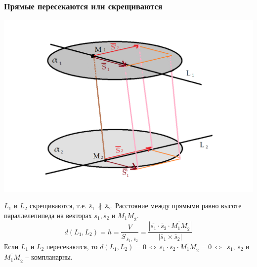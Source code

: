 \documentclass{article}
\begin{document}
\subsubsection{Прямые пересекаются или скрещиваются}
\begin{center}
    \includegraphics[scale=0.6]{pic11.png}
\end{center}
$L_1$ и $L_2$ скрещиваются, т.е. $\overline{s}_1\,\nparallel\,\overline{s}_2$. Расстояние между прямыми равно высоте параллелепипеда на векторах $\overline{s}_1,\overline{s}_2$ и $\overline{M_1M}_2$.
$$ d(L_1,L_2)=h=\frac{V}{S_{\,\overline{s}_1,\,\overline{s}_2}}=\frac{|\overline{s_1}\cdot\overline{s}_2\cdot\overline{M_1M}_2|}{|\overline{s}_1\times\overline{s}_2|} $$
Если $L_1$ и $L_2$ пересекаются, то $d(L_1,L_2)=0\,\Leftrightarrow\,\overline{s_1}\cdot\overline{s}_2\cdot\overline{M_1M}_2=0\,\Leftrightarrow\,$ $\overline{s}_1,\,\overline{s}_2$ и $\overline{M_1M}_2$ -- компланарны.
\newpage
\end{document}
